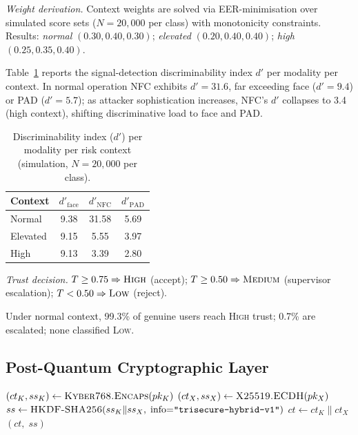 \documentclass[submission]{sacjsub}
\begin{document}
\textit{Weight derivation.} Context weights are solved via
EER-minimisation over simulated score sets (\(N{=}20{,}000\) per
class) with monotonicity constraints. Results: \textit{normal}
\((0.30, 0.40, 0.30)\); \textit{elevated} \((0.20, 0.40, 0.40)\);
\textit{high} \((0.25, 0.35, 0.40)\).

Table~\ref{tab:dprime} reports the signal-detection discriminability
index \(d'\) per modality per context. In normal operation NFC
exhibits \(d'=31.6\), far exceeding face (\(d'=9.4\)) or PAD
(\(d'=5.7\)); as attacker sophistication increases, NFC's \(d'\)
collapses to 3.4 (high context), shifting discriminative load to face
and PAD.

\begin{table}[ht]
\caption{Discriminability index (\(d'\)) per modality per risk context
  (simulation, \(N{=}20{,}000\) per class).}
\label{tab:dprime}
\begin{tabular}{|l|c|c|c|}
\hline
Context & \(d'_{\mathrm{face}}\) & \(d'_{\mathrm{NFC}}\)
  & \(d'_{\mathrm{PAD}}\) \\
\hline
Normal   & 9.38 & 31.58 & 5.69 \\
Elevated & 9.15 &  5.55 & 3.97 \\
High     & 9.13 &  3.39 & 2.80 \\
\hline
\end{tabular}
\end{table}

\textit{Trust decision.} \(T \geq 0.75\Rightarrow\textsc{High}\)
(accept); \(T \geq 0.50\Rightarrow\textsc{Medium}\) (supervisor
escalation); \(T < 0.50\Rightarrow\textsc{Low}\) (reject).

Under normal context, 99.3\% of genuine users reach \textsc{High}
trust; 0.7\% are escalated; none classified \textsc{Low}.

\subsection{Post-Quantum Cryptographic Layer}\label{sec:pqc}

\begin{algorithm}[t]
\caption{TRIsecure HybridKEM.Encapsulate(\(pk\))}
\label{alg:hybridkem}
\begin{algorithmic}[1]
  \State \((ct_K, ss_K) \gets \textsc{Kyber768.Encaps}(pk_K)\)
  \State \((ct_X, ss_X) \gets \textsc{X25519.ECDH}(pk_X)\)
  \State \(ss \gets \textsc{HKDF-SHA256}(ss_K \| ss_X,\;
    \text{info}{=}\texttt{"trisecure-hybrid-v1"})\)
  \State \(ct \gets ct_K \| ct_X\)
  \State \Return \((ct,\; ss)\)
\end{algorithmic}
\end{algorithm}
\end{document}
